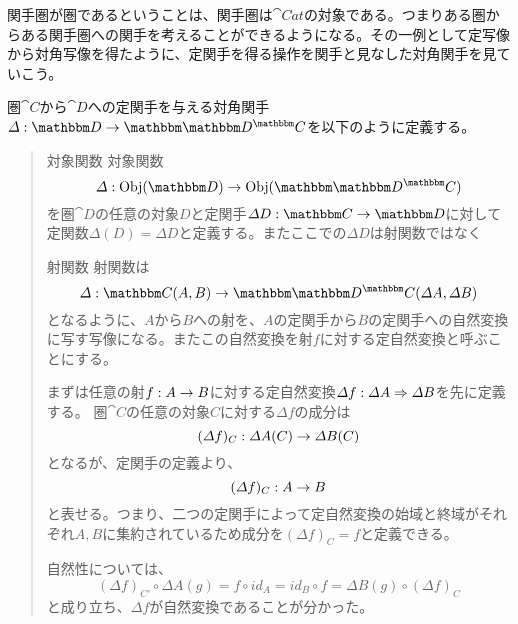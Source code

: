   関手圏が圏であるということは、関手圏は$\cat{Cat}$の対象である。つまりある圏からある関手圏への関手を考えることができるようになる。その一例として定写像から対角写像を得たように、定関手を得る操作を関手と見なした対角関手を見ていこう。\\
  \begin{define}[対角関手]
    圏$\cat{C}$から$\cat{D}$への定関手を与える対角関手$\functor{\varDelta}{D}{\funccat{C}{D}}$を以下のように定義する。
    \begin{quote}
			\begin{mydescription}
				\item[対象関数] 対象関数\[\mor{\varDelta}{\obj{D}}{\obj{\funccat{C}{D}}}\]
				を圏$\cat{D}$の任意の対象$D$と定関手$\functor{\varDelta D}{C}{D}$に対して定関数$\varDelta(D)=\varDelta D$と定義する。またここでの$\varDelta D$は射関数ではなく
				\item[射関数] 
        射関数は\[\mor{\varDelta}{\arset{C}{A}{B}}{\arset{\funccat{C}{D}}{\varDelta A}{\varDelta B}}\]となるように、$A$から$B$への射を、$A$の定関手から$B$の定関手への自然変換に写す写像になる。またこの自然変換を射$f$に対する定自然変換と呼ぶことにする。

        まずは任意の射$f:A\rightarrow B$に対する定自然変換$\varDelta f:\varDelta A\Rightarrow \varDelta B$を先に定義する。
        圏$\cat{C}$の任意の対象$C$に対する$\varDelta f$の成分は\[(\varDelta f)_C:\varDelta A(C)\rightarrow \varDelta B(C)\]となるが、定関手の定義より、\[(\varDelta f)_C:A\rightarrow B\]と表せる。つまり、二つの定関手によって定自然変換の始域と終域がそれぞれ$A,B$に集約されているため成分を$(\varDelta f)_C=f$と定義できる。

        自然性については、\[(\varDelta f)_{C'}\circ\varDelta A(g)=f\circ id_A=id_B\circ f=\varDelta B(g)\circ(\varDelta f)_C\]と成り立ち、$\varDelta f$が自然変換であることが分かった。

        \begin{center}
\end{center}
\end{mydescription}
\end{quote}
\end{define}
